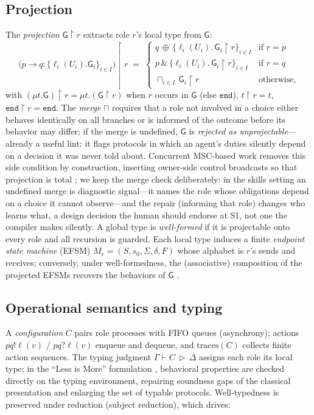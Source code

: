 \documentclass{article}
\newcommand{\gtG}{\mathsf{G}}
\newcommand{\ed}{\mathtt{end}}
\newcommand{\proj}[2]{#1\!\upharpoonright\!#2}
\newcommand{\sends}{\rightarrow}
\newcommand{\merge}{\sqcap}
\newcommand{\lbl}{\ell}
\begin{document}
\subsection{Projection}
The \emph{projection} $\proj{\gtG}{r}$ extracts role $r$'s local type from $\gtG$:
\[
\proj{\big(p \sends q : \{\lbl_i(U_i).\gtG_i\}_{i\in I}\big)}{r} \;=\;
\begin{cases}
q\,{\oplus}\,\{\lbl_i(U_i).\,\proj{\gtG_i}{r}\}_{i\in I} & \text{if } r=p\\[2pt]
p\,\&\,\{\lbl_i(U_i).\,\proj{\gtG_i}{r}\}_{i\in I} & \text{if } r=q\\[2pt]
\sqcap_{i\in I}\, \proj{\gtG_i}{r} & \text{otherwise,}
\end{cases}
\]
with $\proj{(\mu t.\gtG)}{r}=\mu t.(\proj{\gtG}{r})$ when $r$ occurs in $\gtG$ (else $\ed$), $\proj{t}{r}=t$, $\proj{\ed}{r}=\ed$. The \emph{merge} $\merge$ requires that a role not involved in a choice either behaves identically on all branches or is informed of the outcome before its behavior may differ; if the merge is undefined, $\gtG$ is \emph{rejected as unprojectable}---already a useful lint: it flags protocols in which an agent's duties silently depend on a decision it was never told about. Concurrent MSC-based work removes this side condition by construction, inserting owner-side control broadcasts so that projection is total \citep{bollig26}; we keep the merge check deliberately: in the skills setting an undefined merge is diagnostic signal---it names the role whose obligations depend on a choice it cannot observe---and the repair (informing that role) changes who learns what, a design decision the human should endorse at S1, not one the compiler makes silently. A global type is \emph{well-formed} if it is projectable onto every role and all recursion is guarded. Each local type induces a finite \emph{endpoint state machine} (EFSM) $M_r=(S,s_0,\Sigma,\delta,F)$ whose alphabet is $r$'s sends and receives; conversely, under well-formedness, the (associative) composition of the projected EFSMs recovers the behaviors of $\gtG$ \citep{denielou12}.

\subsection{Operational semantics and typing}
A \emph{configuration} $C$ pairs role processes with FIFO queues (asynchrony); actions $pq!\lbl(v)$ / $pq?\lbl(v)$ enqueue and dequeue, and $\mathrm{traces}(C)$ collects finite action sequences. The typing judgment $\Gamma \vdash C \,\triangleright\, \Delta$ assigns each role its local type; in the ``Less is More'' formulation \citep{scalas19}, behavioral properties are checked directly on the typing environment, repairing soundness gaps of the classical presentation and enlarging the set of typable protocols. Well-typedness is preserved under reduction (subject reduction), which drives:
\end{document}
